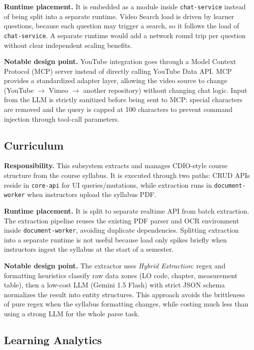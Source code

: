 \textbf{Runtime placement.} It is embedded as a module inside
\texttt{chat-service} instead of being split into a separate runtime.
Video Search load is driven by learner questions, because each question
may trigger a search, so it follows the load of \texttt{chat-service}. A
separate runtime would add a network round trip per question without
clear independent scaling benefits.

\textbf{Notable design point.} YouTube integration goes through a Model
Context Protocol (MCP) server instead of directly calling YouTube Data
API. MCP provides a standardized adapter layer, allowing the video source
to change (YouTube $\to$ Vimeo $\to$ another repository) without changing
chat logic. Input from the LLM is strictly sanitized before being sent to
MCP: special characters are removed and the query is capped at 100
characters to prevent command injection through tool-call parameters.

\subsection{Curriculum}

\textbf{Responsibility.} This subsystem extracts and manages CDIO-style
course structure from the course syllabus. It is executed through two
paths: CRUD APIs reside in \texttt{core-api} for UI queries/mutations,
while extraction runs in \texttt{document-worker} when instructors upload
the syllabus PDF.

\textbf{Runtime placement.} It is split to separate realtime API from
batch extraction. The extraction pipeline reuses the existing PDF parser
and OCR environment inside \texttt{document-worker}, avoiding duplicate
dependencies. Splitting extraction into a separate runtime is not useful
because load only spikes briefly when instructors ingest the syllabus at
the start of a semester.

\textbf{Notable design point.} The extractor uses \emph{Hybrid
Extraction}: regex and formatting heuristics classify raw data zones (LO
code, chapter, measurement table), then a low-cost LLM (Gemini 1.5 Flash)
with strict JSON schema normalizes the result into entity structures. This
approach avoids the brittleness of pure regex when the syllabus
formatting changes, while costing much less than using a strong LLM for
the whole parse task.

\subsection{Learning Analytics}

